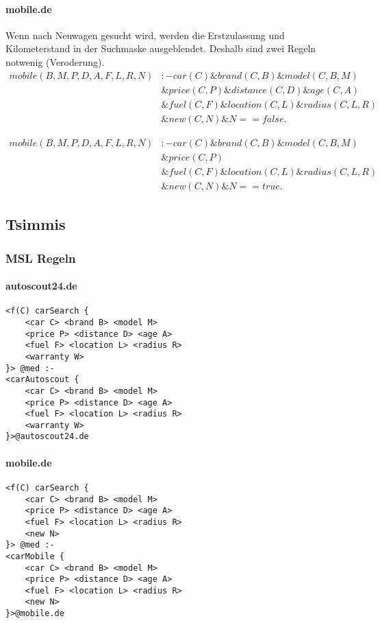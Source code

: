 \documentclass[11pt,a4paper]{scrartcl}
\begin{document}
\paragraph*{mobile.de}
Wenn nach Neuwagen gesucht wird, werden die Erstzulassung und Kilometerstand in der Suchmaske ausgeblendet. Deshalb sind zwei Regeln notwenig (Veroderung). 
\begin{align*}
mobile(B,M,P,D,A,F,L,R,N) &:- car(C) \& brand(C,B) \& model(C,B,M)\\
&\& price(C,P) \& distance(C,D) \& age(C,A)\\
&\& fuel(C,F) \& location(C,L) \& radius(C,L,R)\\
&\& new(C,N) \& N==false.
\end{align*}

\begin{align*}
mobile(B,M,P,D,A,F,L,R,N) &:- car(C) \& brand(C,B) \& model(C,B,M)\\
&\& price(C,P)\\
&\& fuel(C,F) \& location(C,L) \& radius(C,L,R)\\
&\& new(C,N) \& N==true.
\end{align*}


\subsection{Tsimmis}
\subsubsection{MSL Regeln}
\paragraph*{autoscout24.de}
\begin{verbatim}
<f(C) carSearch {
    <car C> <brand B> <model M>
    <price P> <distance D> <age A>
    <fuel F> <location L> <radius R>
    <warranty W>
}> @med :-
<carAutoscout {
    <car C> <brand B> <model M> 
    <price P> <distance D> <age A> 
    <fuel F> <location L> <radius R>
    <warranty W>
}>@autoscout24.de
\end{verbatim}

\paragraph*{mobile.de}
\begin{verbatim}
<f(C) carSearch {
    <car C> <brand B> <model M>
    <price P> <distance D> <age A>
    <fuel F> <location L> <radius R>
    <new N>
}> @med :-
<carMobile {
    <car C> <brand B> <model M> 
    <price P> <distance D> <age A> 
    <fuel F> <location L> <radius R>
    <new N>
}>@mobile.de
\end{verbatim}
\end{document}
